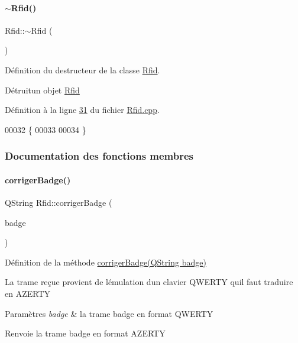 \paragraph{\texorpdfstring{$\sim$\+Rfid()}{~Rfid()}}
{\footnotesize\ttfamily Rfid\+::$\sim$\+Rfid (\begin{DoxyParamCaption}{ }\end{DoxyParamCaption})}



Définition du destructeur de la classe \hyperlink{class_rfid}{Rfid}. 

Détruitun objet \hyperlink{class_rfid}{Rfid} 

Définition à la ligne \hyperlink{_rfid_8cpp_source_l00031}{31} du fichier \hyperlink{_rfid_8cpp_source}{Rfid.\+cpp}.


\begin{DoxyCode}
00032 \{
00033 
00034 \}
\end{DoxyCode}


\subsubsection{Documentation des fonctions membres}
\mbox{\label{class_rfid_afb99366646ac75b7e1d28302d38bf4f2}} 
\paragraph{\texorpdfstring{corriger\+Badge()}{corrigerBadge()}}
{\footnotesize\ttfamily Q\+String Rfid\+::corriger\+Badge (\begin{DoxyParamCaption}\item[{Q\+String}]{badge }\end{DoxyParamCaption})}



Définition de la méthode \hyperlink{class_rfid_afb99366646ac75b7e1d28302d38bf4f2}{corriger\+Badge(\+Q\+String badge)} 

La trame reçue provient de l\textquotesingle{}émulation d\textquotesingle{}un clavier Q\+W\+E\+R\+TY qu\textquotesingle{}il faut traduire en A\+Z\+E\+R\+TY 
\begin{DoxyParams}{Paramètres}
{\em badge} & la trame badge en format Q\+W\+E\+R\+TY \\
\hline
\end{DoxyParams}
\begin{DoxyReturn}{Renvoie}
la trame badge en format A\+Z\+E\+R\+TY 
\end{DoxyReturn}


